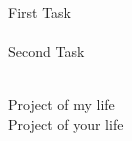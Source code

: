 \documentclass[11pt]{spidercv}
\begin{document}
\begin{SecondaryPage}{\ColorBackground}

    \Experience
    {\ColorHighlight}{First Task}{}{}
    {
        \lorem\\
        \textbf{\lorem}\\
        \lorem
    }
    \Experience
    {\ColorHighlight}{Second Task}{}{}
    {
        \lorem\\
        \lorem\\
        \lorem
    }
    \vspace*{2cm}

    \vspace*{0.5cm}
    \begin{DoubleColumns}
        \Experience
        {\ColorHighlight}{Project of my life}{}{}
        {
            \lorem\\
            \lorem
        }
        \nextcolumn
        \Experience
        {\ColorHighlight}{Project of your life}{}{}
        {
            \lorem\\
            \lorem
        }
    \end{DoubleColumns}
    \vspace*{2cm}


\end{SecondaryPage}
\end{document}

